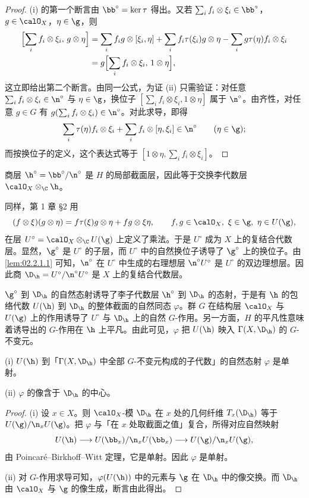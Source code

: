 \begin{proof}
(i) 的第一个断言由 $\bb^\circ=\ker\tau$ 得出。又若 $\sum_i f_i\otimes\xi_i\in\bb^\circ$，$g\in\calO_X$，$\eta\in\g$，则
\begin{align*}
\Bigl[\sum_i f_i\otimes\xi_i,\,g\otimes\eta\Bigr]
&=\sum_i f_ig\otimes[\xi_i,\eta]+\sum_i f_i\tau(\xi_i)g\otimes\eta-\sum_i g\tau(\eta)f_i\otimes\xi_i\\
&=g\Bigl[\sum_i f_i\otimes\xi_i,\,1\otimes\eta\Bigr],
\end{align*}
这立即给出第二个断言。由同一公式，为证 (ii) 只需验证：对任意 $\sum_i f_i\otimes\xi_i\in\n^\circ$ 与 $\eta\in\g$，换位子 $[\sum_i f_i\otimes\xi_i,1\otimes\eta]$ 属于 $\n^\circ$。由齐性，对任意 $g\in G$ 有 $g(\sum_i f_i\otimes\xi_i)\in\n^\circ$。对此求导，即得
$$\sum_i\tau(\eta)f_i\otimes\xi_i+\sum_i f_i\otimes[\eta,\xi_i]\in\n^\circ\qquad(\eta\in\g);$$
而按换位子的定义，这个表达式等于 $[1\otimes\eta,\sum_i f_i\otimes\xi_i]$。
\end{proof}

商层 $\h^\circ=\bb^\circ/\n^\circ$ 是 $H$ 的局部截面层，因此等于交换李代数层 $\calO_X\otimes_\C\h$。

同样，第 1 章 §2 用
$$(f\otimes\xi)(g\otimes\eta)=f\tau(\xi)g\otimes\eta+fg\otimes\xi\eta,\qquad f,g\in\calO_X,\ \xi\in\g,\ \eta\in U(\g),$$
在层 $U^\circ=\calO_X\otimes_\C U(\g)$ 上定义了乘法。于是 $U^\circ$ 成为 $X$ 上的复结合代数层。显然，$\g^\circ$ 是 $U^\circ$ 的子层，而 $U^\circ$ 中的自然换位子诱导了 $\g^\circ$ 上的换位子。由 \ref{lem:02.2.1.1} 可知，$\n^\circ$ 在 $U^\circ$ 中生成的右理想层 $\n^\circ U^\circ$ 是 $U^\circ$ 的双边理想层。因此商 $\D_\h=U^\circ/\n^\circ U^\circ$ 是 $X$ 上的复结合代数层。

$\g^\circ$ 到 $\D_\h$ 的自然态射诱导了李子代数层 $\h^\circ$ 到 $\D_\h$ 的态射，于是有 $\h$ 的包络代数 $U(\h)$ 到 $\D_\h$ 的整体截面的自然同态 $\varphi$。群 $G$ 在结构层 $\calO_X$ 与 $U(\g)$ 上的作用诱导了 $U^\circ$ 与 $\D_\h$ 上的自然 $G$-作用。另一方面，$H$ 的平凡性意味着诱导出的 $G$-作用在 $\h$ 上平凡。由此可见，$\varphi$ 把 $U(\h)$ 映入 $\Gamma(X,\D_\h)$ 的 $G$-不变元。

\begin{lemma}\label{lem:02.2.1.2}
(i) $U(\h)$ 到「$\Gamma(X,\D_\h)$ 中全部 $G$-不变元构成的子代数」的自然态射 $\varphi$ 是单射。

(ii) $\varphi$ 的像含于 $\D_\h$ 的中心。
\end{lemma}

\begin{proof}
(i) 设 $x\in X$。则 $\calO_X$-模 $\D_\h$ 在 $x$ 处的几何纤维 $T_x(\D_\h)$ 等于 $U(\g)/\n_xU(\g)$。把 $\varphi$ 与「在 $x$ 处取截面之值」复合，所得对应自然映射
$$U(\h)\longrightarrow U(\bb_x)/\n_xU(\bb_x)\longrightarrow U(\g)/\n_xU(\g),$$
由 Poincar\'e--Birkhoff--Witt 定理，它是单射。因此 $\varphi$ 是单射。

(ii) 对 $G$-作用求导可知，$\varphi(U(\h))$ 中的元素与 $\g$ 在 $\D_\h$ 中的像交换。而 $\D_\h$ 由 $\calO_X$ 与 $\g$ 的像生成，断言由此得出。
\end{proof}

